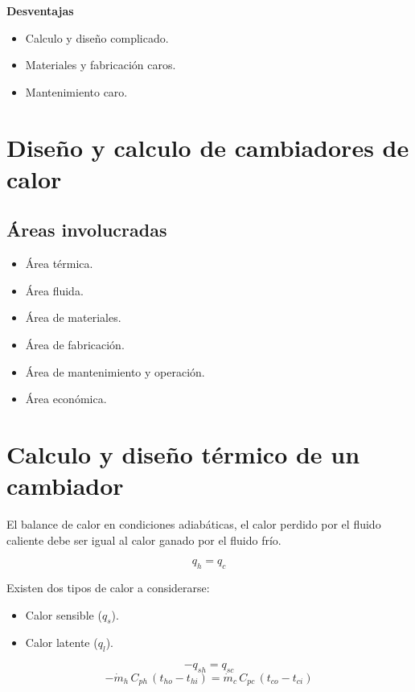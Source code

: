 \textbf{Desventajas}
\begin{itemize}
    \item Calculo y diseño complicado.
    \item Materiales y fabricación caros.
    \item Mantenimiento caro.
\end{itemize}

\section{Diseño y calculo de cambiadores de calor}

\subsection{Áreas involucradas}
\begin{itemize}
    \item Área térmica.
    \item Área fluida.
    \item Área de materiales.
    \item Área de fabricación.
    \item Área de mantenimiento y operación.
    \item Área económica.
\end{itemize}

\section{Calculo y diseño térmico de un cambiador}

El balance de calor en condiciones adiabáticas, el calor perdido por el fluido
caliente debe ser igual al calor ganado por el fluido frío.

\begin{equation}
    q_h = q_c
\end{equation}

Existen dos tipos de calor a considerarse:

\begin{itemize}
    \item Calor sensible ($q_s$).
    \item Calor latente ($q_l$).
\end{itemize}

\begin{equation*}
    -q_{sh} = q_{sc}
\end{equation*}
\begin{equation}
    -\dot{m}_h\,C_{ph}\,(t_{ho} - t_{hi}) = \dot{m}_c\,C_{pc}\,(t_{co} - t_{ci})
\end{equation}

